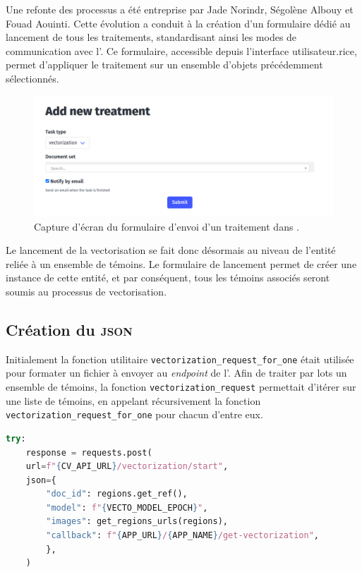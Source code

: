 Une refonte des processus a été entreprise par Jade Norindr, Ségolène Albouy et Fouad Aouinti. Cette évolution a conduit à la création d'un formulaire dédié au lancement de tous les traitements, standardisant ainsi les modes de communication avec l'\api. Ce formulaire, accessible depuis l'interface utilisateur.rice, permet d'appliquer le traitement sur un ensemble d'objets précédemment sélectionnés. 

	\begin{figure}[h]
	\centering
	\includegraphics[width=15cm]{figues/form_traitement.png}
	\caption{Capture d'écran du formulaire d'envoi d'un traitement dans \aikon.}
	\label{fig:eida_send_manifest}
	\end{figure}

Le lancement de la vectorisation se fait donc désormais au niveau de l'entité \tr reliée à un ensemble de témoins. Le formulaire de lancement permet de créer une instance de cette entité, et par conséquent, tous les témoins associés seront soumis au processus de vectorisation.

\subsection{Création du \textsc{json}}

Initialement la fonction utilitaire \texttt{vectorization\_request\_for\_one} était utilisée pour formater un fichier \json à envoyer au \textit{endpoint} de l'\api. Afin de traiter par lots un ensemble de témoins, la fonction \texttt{vectorization\_request} permettait d'itérer sur une liste de témoins, en appelant récursivement la fonction \texttt{vectorization\_request\_for\_one} pour chacun d'entre eux.

\begin{lstlisting}[language=python, frame=single, breaklines=true, caption={Extrait de la fonction gérant l'envoi de \json à l'\api dans \texttt{app/vectorization/utils.py}}]
try:
	response = requests.post(
	url=f"{CV_API_URL}/vectorization/start",
	json={
		"doc_id": regions.get_ref(),
		"model": f"{VECTO_MODEL_EPOCH}",
		"images": get_regions_urls(regions),
		"callback": f"{APP_URL}/{APP_NAME}/get-vectorization",
		},
	)
\end{lstlisting}

